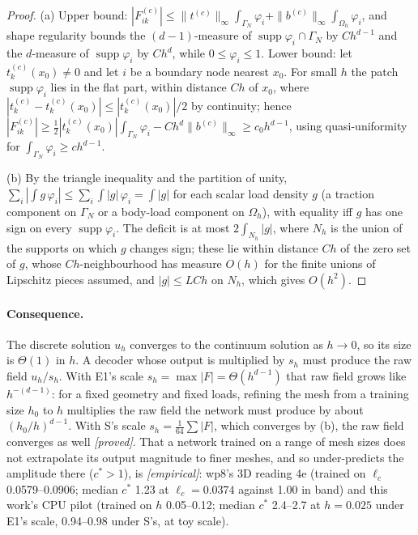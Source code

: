 \begin{proof}
(a) Upper bound: $|F^{(c)}_{ik}| \le \|t^{(c)}\|_\infty \int_{\Gamma_N}
\varphi_i + \|b^{(c)}\|_\infty \int_{\Omega_h} \varphi_i$, and shape
regularity bounds the $(d-1)$-measure of $\operatorname{supp}\varphi_i \cap
\Gamma_N$ by $C h^{d-1}$ and the $d$-measure of $\operatorname{supp}\varphi_i$
by $C h^d$, while $0 \le \varphi_i \le 1$. Lower bound: let $t^{(c)}_k(x_0)
\ne 0$ and let $i$ be a boundary node nearest $x_0$. For small $h$ the patch
$\operatorname{supp}\varphi_i$ lies in the flat part, within distance $C h$
of $x_0$, where $|t^{(c)}_k - t^{(c)}_k(x_0)| \le |t^{(c)}_k(x_0)|/2$ by
continuity; hence $|F^{(c)}_{ik}| \ge \tfrac12 |t^{(c)}_k(x_0)| \int_{\Gamma_N}
\varphi_i - C h^d \|b^{(c)}\|_\infty \ge c_0 h^{d-1}$, using quasi-uniformity
for $\int_{\Gamma_N} \varphi_i \ge c h^{d-1}$.

(b) By the triangle inequality and the partition of unity, $\sum_i |\int
g\,\varphi_i| \le \sum_i \int |g|\,\varphi_i = \int |g|$ for each scalar load
density $g$ (a traction component on $\Gamma_N$ or a body-load component on
$\Omega_h$), with equality iff $g$ has one sign on every
$\operatorname{supp}\varphi_i$. The deficit is at most $2\int_{N_h} |g|$,
where $N_h$ is the union of the supports on which $g$ changes sign; these lie
within distance $C h$ of the zero set of $g$, whose $C h$-neighbourhood has
measure $O(h)$ for the finite unions of Lipschitz pieces assumed, and $|g| \le
L C h$ on $N_h$, which gives $O(h^2)$.
\end{proof}

\paragraph{Consequence.} The discrete solution $u_h$ converges to the
continuum solution as $h \to 0$, so its size is $\Theta(1)$ in $h$. A decoder
whose output is multiplied by $s_h$ must produce the raw field $u_h / s_h$.
With E1's scale $s_h = \max|F| = \Theta(h^{d-1})$ that raw field grows like
$h^{-(d-1)}$: for a fixed geometry and fixed loads, refining the mesh from a
training size $h_0$ to $h$ multiplies the raw field the network must produce
by about $(h_0/h)^{d-1}$. With S's scale $s_h = \tfrac{1}{64}\sum|F|$, which
converges by (b), the raw field converges as well \emph{[proved]}. That a
network trained on a range of mesh sizes does not extrapolate its output
magnitude to finer meshes, and so under-predicts the amplitude there ($c^\ast
> 1$), is \emph{[empirical]}: wp8's 3D reading 4e (trained on $\ell_c$
0.0579--0.0906; median $c^\ast$ 1.23 at $\ell_c = 0.0374$ against 1.00 in
band) and this work's CPU pilot (trained on $h$ 0.05--0.12; median $c^\ast$
2.4--2.7 at $h = 0.025$ under E1's scale, 0.94--0.98 under S's, at toy
scale).

